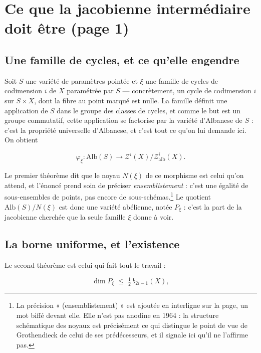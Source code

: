\documentclass[11pt,a4paper]{article}
\begin{document}
\section*{Ce que la jacobienne intermédiaire doit être (page 1)}

\subsection*{Une famille de cycles, et ce qu'elle engendre}

Soit $S$ une variété de paramètres pointée et $\xi$ une famille de cycles de
codimension $i$ de $X$ paramétrée par $S$ — concrètement, un cycle de
codimension $i$ sur $S\times X$, dont la fibre au point marqué est nulle. La
famille définit une application de $S$ dans le groupe des classes de cycles, et
comme le but est un groupe commutatif, cette application se factorise par la
variété d'Albanese de $S$ : c'est la propriété universelle d'Albanese, et c'est
tout ce qu'on lui demande ici. On obtient

\[
  \varphi_{\xi} : \mathrm{Alb}(S) \longrightarrow
  \mathcal{Z}^{i}(X)/\mathcal{Z}^{i}_{\mathrm{alb}}(X).
\]

Le premier théorème dit que le noyau $N(\xi)$ de ce morphisme est celui qu'on
attend, et l'énoncé prend soin de préciser \emph{ensemblistement} : c'est une
égalité de sous-ensembles de points, pas encore de sous-schémas.\footnote{La
précision « (ensemblistement) » est ajoutée en interligne sur la page, un mot
biffé devant elle. Elle n'est pas anodine en 1964 : la structure schématique
des noyaux est précisément ce qui distingue le point de vue de Grothendieck de
celui de ses prédécesseurs, et il signale ici qu'il ne l'affirme pas.} Le
quotient $\mathrm{Alb}(S)/N(\xi)$ est donc une variété abélienne, notée
$P_{\xi}$ : c'est la part de la jacobienne cherchée que la seule famille $\xi$
donne à voir.

\subsection*{La borne uniforme, et l'existence}

Le second théorème est celui qui fait tout le travail :

\[
  \dim P_{\xi} \;\leq\; \tfrac{1}{2}\, b_{2i-1}(X),
\]
\end{document}
